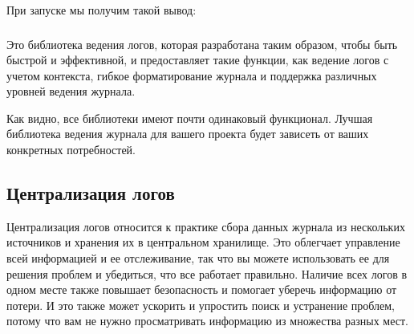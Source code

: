 \documentclass[letterpaper,10pt,russian]{sphinxmanual}
\begin{document}
\begin{sphinxVerbatim}[commandchars=\\\{\}]
 
   

  

  
        
    
 
         
     

\end{sphinxVerbatim}

\sphinxAtStartPar
При запуске мы получим такой вывод:

\sphinxAtStartPar
{}


\subsubsection{}
\label{\detokenize{educational_materials/logging/content:logbook}}
\sphinxAtStartPar
Это библиотека ведения логов, которая разработана таким образом, чтобы быть быстрой и эффективной, и предоставляет такие функции, как ведение логов с учетом контекста, гибкое форматирование журнала и поддержка различных уровней ведения журнала.

\sphinxAtStartPar
Как видно, все библиотеки имеют почти одинаковый функционал. Лучшая библиотека ведения журнала для вашего проекта будет зависеть от ваших конкретных потребностей.


\subsection{Централизация логов}
\label{\detokenize{educational_materials/logging/content:id6}}
\sphinxAtStartPar
Централизация логов относится к практике сбора данных журнала из нескольких источников и хранения их в центральном хранилище. Это облегчает управление всей информацией и ее отслеживание, так что вы можете использовать ее для решения проблем и убедиться, что все работает правильно. Наличие всех логов в одном месте также повышает безопасность и помогает уберечь информацию от потери. И это также может ускорить и упростить поиск и устранение проблем, потому что вам не нужно просматривать информацию из множества разных мест.
\end{document}
